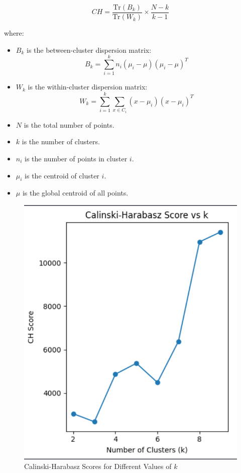 \documentclass[conference]{IEEEtran}
\begin{document}
\begin{equation}
CH = \frac{\text{Tr}(B_k)}{\text{Tr}(W_k)} \times \frac{N - k}{k - 1}
\end{equation}

where:
\begin{itemize}
    \item \( B_k \) is the between-cluster dispersion matrix:
    \begin{equation}
    B_k = \sum_{i=1}^{k} n_i (\mu_i - \mu)(\mu_i - \mu)^T
    \end{equation}
    \item \( W_k \) is the within-cluster dispersion matrix:
    \begin{equation}
    W_k = \sum_{i=1}^{k} \sum_{x \in C_i} (x - \mu_i)(x - \mu_i)^T
    \end{equation}
    \item \( N \) is the total number of points.
    \item \( k \) is the number of clusters.
    \item \( n_i \) is the number of points in cluster \( i \).
    \item \( \mu_i \) is the centroid of cluster \( i \).
    \item \( \mu \) is the global centroid of all points.
\end{itemize}


\begin{figure}[htbp]
    \centering
    \includegraphics[width=\columnwidth]{calinski-harabasz_score.png}
    \caption{Calinski-Harabasz Scores for Different Values of \(k\)}
    \label{fig:example}
\end{figure}
\end{document}
